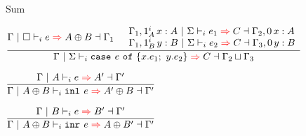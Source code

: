 \documentclass{beamer}
\begin{document}
\begin{frame}{Sum}

\begin{center}
  $\infrule{\infer{\Gamma}{\emptyhint}{e}{\Sum{A}{B}}{\Gamma_1} \quad \begin{array}{l} \infer{\extend{\Gamma_1}[\totalqty{\One}{A}]{x}{A}}{\Sigma}{e_1}{C}{\extend{\Gamma_2}[\Zero]{x}{A}} \\ \infer{\extend{\Gamma_1}[\totalqty{\One}{B}]{y}{B}}{\Sigma}{e_2}{C}{\extend{\Gamma_3}[\Zero]{y}{B}} \end{array}}{\infer{\Gamma}{\Sigma}{\newcase{e}{x}{e_1}{y}{e_2}}{C}{\lubctx{\Gamma_2}{\Gamma_3}}}$

  \vspace{2em}

  $\infrule{\infer{\Gamma}{\typehint{A}}{e}{A'}{\Gamma'}}{\infer{\Gamma}{\typehint{\Sum{A}{B}}}{\inl{e}}{\Sum{A'}{B}}{\Gamma'}}$

  \vspace{1em}

  $\infrule{\infer{\Gamma}{\typehint{B}}{e}{B'}{\Gamma'}}{\infer{\Gamma}{\typehint{\Sum{A}{B}}}{\inr{e}}{\Sum{A}{B'}}{\Gamma'}}$
\end{center}

\end{frame}
\end{document}
